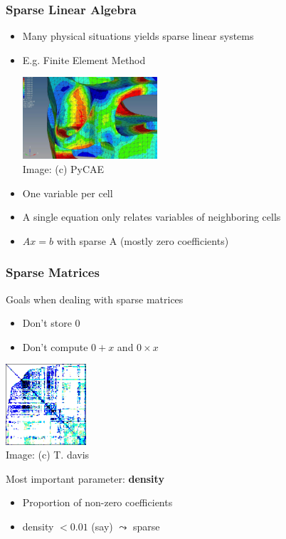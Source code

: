 \documentclass[xcolor={x11names,svgnames},x11names,svgnames]{beamer}
\newcommand{\red}{\alert}
\begin{document}
\begin{frame}
  \frametitle{Sparse Linear Algebra}

  \begin{itemize}
  \item Many physical situations yields \red{sparse} linear systems
  \item E.g. Finite Element Method
    \begin{center}
      \includegraphics[width=5cm]{fem_sample} \\
      {\tiny Image: (c) PyCAE} 
    \end{center}
    
  \item One variable per cell
  \item A single equation \red{only} relates variables of \red{neighboring} cells
  \item $Ax = b$ with \red{sparse} A (mostly zero coefficients)
  \end{itemize}
\end{frame}


\begin{frame}
  \frametitle{Sparse Matrices}

  \begin{block}{Goals when dealing with sparse matrices}
    \begin{itemize}
    \item Don't store 0
    \item Don't compute $0 + x$ and $0 \times x$
    \end{itemize}
  \end{block}
  
  \begin{center}
    \includegraphics[width=3cm]{sparse.png} \\
    {\tiny Image: (c) T. davis} 
  \end{center}
  
  \begin{block}{Most important parameter: \textbf{density}}
    \begin{itemize}
    \item Proportion of \red{non-zero} coefficients
    \item density $< 0.01$ (say) $\leadsto$ sparse
    \end{itemize}
  \end{block}
  
\end{frame}
  
\end{document}
